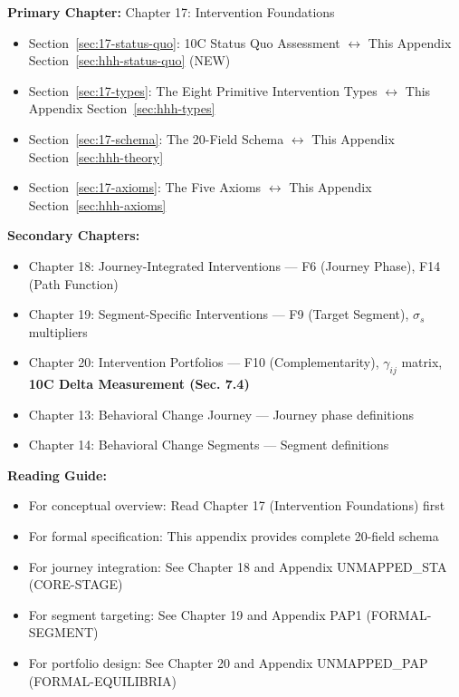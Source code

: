 \begin{tcolorbox}[colback=purple!5!white, colframe=purple!75!black,
    title=Chapter Linkage]

\textbf{Primary Chapter:} Chapter 17: Intervention Foundations
\begin{itemize}[nosep]
\item Section~\ref{sec:17-status-quo}: 10C Status Quo Assessment $\leftrightarrow$ This Appendix Section~\ref{sec:hhh-status-quo} (NEW)
\item Section~\ref{sec:17-types}: The Eight Primitive Intervention Types $\leftrightarrow$ This Appendix Section~\ref{sec:hhh-types}
\item Section~\ref{sec:17-schema}: The 20-Field Schema $\leftrightarrow$ This Appendix Section~\ref{sec:hhh-theory}
\item Section~\ref{sec:17-axioms}: The Five Axioms $\leftrightarrow$ This Appendix Section~\ref{sec:hhh-axioms}
\end{itemize}

\textbf{Secondary Chapters:}
\begin{itemize}[nosep]
\item Chapter 18: Journey-Integrated Interventions --- F6 (Journey Phase), F14 (Path Function)
\item Chapter 19: Segment-Specific Interventions --- F9 (Target Segment), $\sigma_s$ multipliers
\item Chapter 20: Intervention Portfolios --- F10 (Complementarity), $\gamma_{ij}$ matrix, \textbf{10C Delta Measurement (Sec. 7.4)}
\item Chapter 13: Behavioral Change Journey --- Journey phase definitions
\item Chapter 14: Behavioral Change Segments --- Segment definitions
\end{itemize}

\textbf{Reading Guide:}
\begin{itemize}[nosep]
\item For conceptual overview: Read Chapter 17 (Intervention Foundations) first
\item For formal specification: This appendix provides complete 20-field schema
\item For journey integration: See Chapter 18 and Appendix UNMAPPED_STA (CORE-STAGE)
\item For segment targeting: See Chapter 19 and Appendix PAP1 (FORMAL-SEGMENT)
\item For portfolio design: See Chapter 20 and Appendix UNMAPPED_PAP (FORMAL-EQUILIBRIA)
\end{itemize}

\end{tcolorbox}


